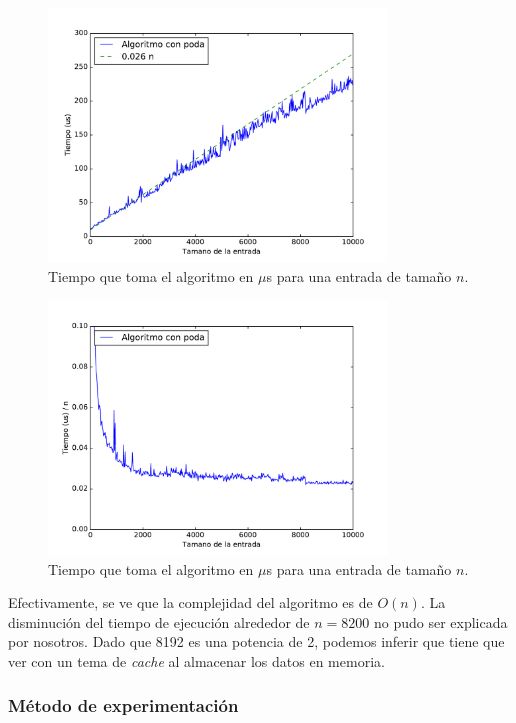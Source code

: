 \begin{figure}[H]
 \centering
	\includegraphics[width=0.8\textwidth]{img/tiempos/kamehameha3.pdf}
	\caption{\footnotesize Tiempo que toma el algoritmo en $\mu$s para una entrada de tamaño $n$.}
	\label{fig:kamehameha-tiempos3}
\end{figure}

\begin{figure}[H]
 \centering
	\includegraphics[width=0.8\textwidth]{img/tiempos/kamehameha4.pdf}
	\caption{\footnotesize Tiempo que toma el algoritmo en $\mu$s para una entrada de tamaño $n$.}
	\label{fig:kamehameha-tiempos4}
\end{figure}

Efectivamente, se ve que la complejidad del algoritmo es de $O(n)$. La disminución del tiempo de ejecución alrededor de $n = 8200$ no pudo ser explicada por nosotros. Dado que 8192 es una potencia de 2, podemos inferir que tiene que ver con un tema de \emph{cache} al almacenar los datos en memoria.

\subsubsection{M\'etodo de experimentación}

